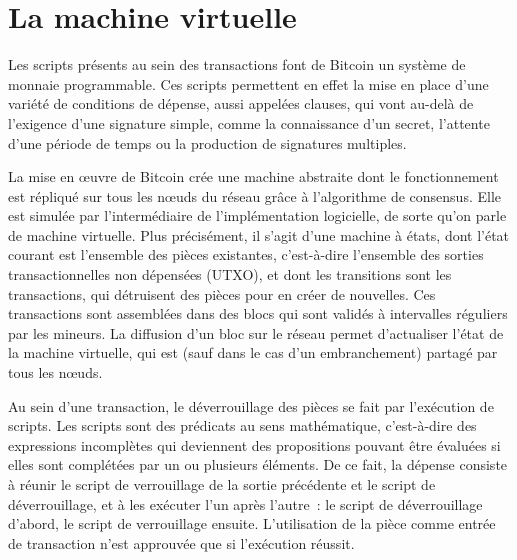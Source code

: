 %
%

\section*{La machine virtuelle}

Les scripts présents au sein des transactions font de Bitcoin un système de monnaie programmable. Ces scripts permettent en effet la mise en place d'une variété de conditions de dépense, aussi appelées clauses, qui vont au-delà de l'exigence d'une signature simple, comme la connaissance d'un secret, l'attente d'une période de temps ou la production de signatures multiples.

La mise en œuvre de Bitcoin crée une machine abstraite dont le fonctionnement est répliqué sur tous les nœuds du réseau grâce à l'algorithme de consensus. Elle est simulée par l'intermédiaire de l'implémentation logicielle, de sorte qu'on parle de machine virtuelle. Plus précisément, il s'agit d'une machine à états, dont l'état courant est l'ensemble des pièces existantes, c'est-à-dire l'ensemble des sorties transactionnelles non dépensées (UTXO), et dont les transitions sont les transactions, qui détruisent des pièces pour en créer de nouvelles. Ces transactions sont assemblées dans des blocs qui sont validés à intervalles réguliers par les mineurs. La diffusion d'un bloc sur le réseau permet d'actualiser l'état de la machine virtuelle, qui est (sauf dans le cas d'un embranchement) partagé par tous les nœuds.

Au sein d'une transaction, le déverrouillage des pièces se fait par l'exécution de scripts. Les scripts sont des prédicats au sens mathématique, c'est-à-dire des expressions incomplètes qui deviennent des propositions pouvant être évaluées si elles sont complétées par un ou plusieurs éléments. De ce fait, la dépense consiste à réunir le script de verrouillage de la sortie précédente et le script de déverrouillage, et à les exécuter l'un après l'autre~: le script de déverrouillage d'abord, le script de verrouillage ensuite. L'utilisation de la pièce comme entrée de transaction n'est approuvée que si l'exécution réussit.

